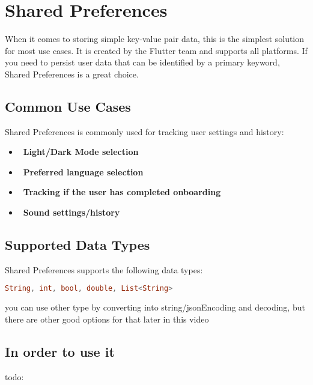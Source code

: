 
\section{Shared Preferences}
When it comes to storing simple key-value pair data, 
this is the simplest solution for most use cases. 
It is created by the Flutter team and supports all platforms. 
If you need to persist user data that can be identified by a primary keyword, Shared Preferences is a great choice.

\subsection{Common Use Cases}

Shared Preferences is commonly used for tracking user settings and history:

\begin{itemize} 
  \item{\faMoon\ \textbf{Light/Dark Mode selection}} 
  \item{\faGlobe\ \textbf{Preferred language selection}} 
  \item{\faCheckCircle\ \textbf{Tracking if the user has completed onboarding}}  
  \item{\faVolumeUp\ \textbf{Sound settings/history}} 
\end{itemize}

\subsection{Supported Data Types}

Shared Preferences supports the following data types:

\begin{lstlisting}[language=Dart]
    String, int, bool, double, List<String>
\end{lstlisting}
you can use other type by converting into string/jsonEncoding and decoding,
but there are other good options for that later in this video
 

\subsection{
    In order to use it
}
todo: 